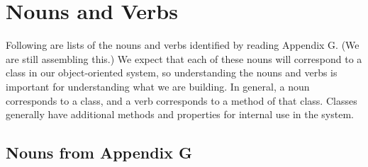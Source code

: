 \documentclass[titlepage]{article}
\begin{document}
\section{Nouns and Verbs}

Following are lists of the nouns and verbs identified by reading Appendix G.  (We are still assembling this.)  We expect that each of these nouns will correspond to a class in our object-oriented system, so understanding the nouns and verbs is important for understanding what we are building.  In general, a noun corresponds to a class, and a verb corresponds to a method of that class.  Classes generally have additional methods and properties for internal use in the system.

\subsection{Nouns from Appendix G}
\end{document}
